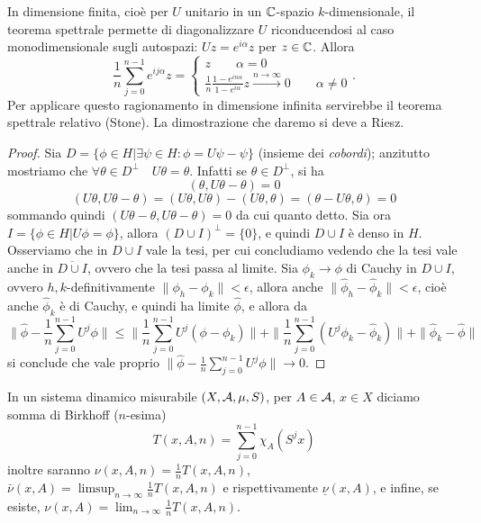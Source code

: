 \begin{oss}
 In dimensione finita, cioè per $U$ unitario in un $\mathbb{C}$-spazio $k$-dimensionale, 
 il teorema spettrale permette di diagonalizzare $U$ riconducendosi al caso monodimensionale sugli autospazi: $Uz=e^{i\alpha}z$ per $z\in\mathbb{C}$. 
 Allora
 \[\frac{1}{n}\sum_{j=0}^{n-1}e^{ij\alpha}z=\begin{cases} z \qquad \alpha=0 \\ 
 \frac{1}{n}\frac{1-e^{in\alpha}}{1-e^{i\alpha}}z \overset{n\rightarrow\infty}{\longrightarrow}0 \qquad \alpha\neq 0\end{cases}. \]
 Per applicare questo ragionamento in dimensione infinita servirebbe il teorema spettrale relativo (Stone). La dimostrazione che daremo si deve a Riesz.
\end{oss}

\begin{proof}
 Sia $D=\{\phi\in H|\exists\psi\in H : \phi=U\psi-\psi\}$ (insieme dei \emph{cobordi}); anzitutto mostriamo che $\forall \theta \in D^\bot \quad U\theta=\theta$. 
 Infatti se $\theta \in D^\bot$, si ha
 \[(\theta, U\theta-\theta)=0\]
 \[(U\theta,U\theta-\theta)=(U\theta,U\theta)-(U\theta,\theta)=(\theta-U\theta,\theta)=0\]
 sommando quindi $(U\theta-\theta,U\theta-\theta)=0$ da cui quanto detto.
 Sia ora $I=\{\phi\in H | U\phi=\phi\}$, allora $(D\cup I)^\bot=\{0\}$, e quindi $D\cup I$ è denso in $H$. 
 Osserviamo che in $D\cup I$ vale la tesi, per cui concludiamo vedendo che la tesi vale anche in $\overline{D\cup I}$, ovvero che la tesi passa al limite. 
 Sia $\phi_k\rightarrow\phi$ di Cauchy in $D\cup I$, ovvero $h,k$-definitivamente $\|\phi_h-\phi_k\|<\epsilon$, allora anche $\|\hat\phi_h-\hat\phi_k\|<\epsilon$, 
 cioè anche $\hat\phi_k$ è di Cauchy, e quindi ha limite $\hat\phi$, e allora da
 \[\|\hat\phi-\frac{1}{n}\sum_{j=0}^{n-1}U^j\phi\|\leq \|\frac{1}{n}\sum_{j=0}^{n-1}U^j(\phi-\phi_k)\|+
  \|\frac{1}{n}\sum_{j=0}^{n-1}(U^j\phi_k-\hat\phi_k)\|+\|\hat\phi_k-\hat\phi\|\]
 si conclude che vale proprio $\|\hat\phi-\frac{1}{n}\sum_{j=0}^{n-1}U^j\phi\|\rightarrow 0$.
\end{proof}

\begin{defi}In un sistema dinamico misurabile $(X,\mathcal{A},\mu,S)$, per $A\in\mathcal{A}$, $x\in X$ diciamo somma di Birkhoff ($n$-esima) \[T(x,A,n)=\sum_{j=0}^{n-1}\chi_A(S^jx)\]
inoltre saranno $\nu(x,A,n)=\frac{1}{n}T(x,A,n)$, $\bar\nu(x,A)=\limsup_{n\rightarrow\infty}\frac{1}{n}T(x,A,n)$ e rispettivamente $\underline\nu(x,A)$, e infine, se esiste, $\nu(x,A)=\lim_{n\rightarrow\infty}\frac{1}{n}T(x,A,n)$.
\end{defi}


